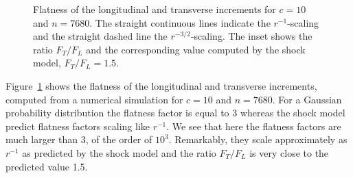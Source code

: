 \begin{figure}
\caption{ Flatness of the longitudinal and transverse increments for
$c = 10$ and $n = 7680$. The straight continuous lines indicate the
$r^{-1}$-scaling and the straight dashed line the $r^{-3/2}$-scaling.
The inset shows the ratio $F_T/F_L$ and the corresponding value
computed by the shock model, $F_T/F_L = 1.5$.  }
\label{fig_flatness}
\end{figure}
%
Figure~\ref{fig_flatness} shows the flatness of the longitudinal and
transverse increments, computed from a numerical simulation for $c =
10$ and $n = 7680$.
%
For a Gaussian probability distribution the flatness factor is equal
to 3 whereas the shock model predict flatness factors scaling like
$r^{-1}$.
%
We see that here the flatness factors are much larger than 3, of the
order of $10^3$.
%
Remarkably, they scale approximately as $r^{-1}$ as predicted by the
shock model and the ratio $F_T/F_L$ is very close to the predicted
value 1.5.



